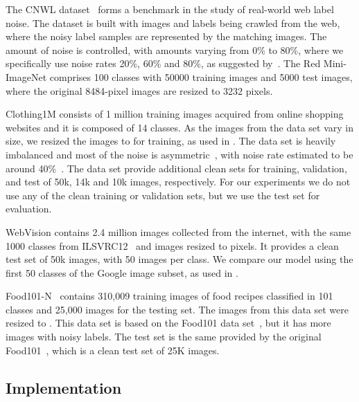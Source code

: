 \documentclass[review]{elsarticle}
\begin{document}
 
The CNWL dataset~\cite{jiang2020beyond} forms a benchmark in the study of real-world web label noise. The dataset is built with images and labels being crawled from the web, where the noisy label samples are represented by the matching images. 
The amount of noise is controlled, with amounts varying from 0\% to 80\%, where we specifically use noise rates 20\%, 60\% and 80\%, as suggested by~\cite{FaMUS}. 
The Red Mini-ImageNet comprises 100 classes with 50000 training images and 5000 test images, where the original 8484-pixel images are resized to 3232 pixels.

Clothing1M consists of 1 million training images acquired from online shopping websites and it is composed of 14 classes.
As the images from the data set vary in size, we resized the images to  for training, as used in \cite{li2020dividemix, han2019deep}.
The data set is heavily imbalanced and most of the noise is asymmetric~\cite{yi2019probabilistic}, with noise rate estimated to be around 40\%~\cite{xiao2015learning}. The data set provide additional clean sets for 
training, validation, and test of 50k, 14k and 10k images, respectively. For our experiments we do not use any of the clean training or validation sets, but we use the test set for evaluation.

WebVision contains 2.4 million images collected from the internet, with the same 1000 classes from ILSVRC12~\cite{deng2009imagenet} and images resized  to  pixels. It provides a clean test set of 50k images, with 50 images per class. We compare our model using the first 50 classes of the Google image subset, as used in \cite{li2020dividemix, chen2019understanding}.


Food101-N~\cite{lee2018cleannet} contains 310,009 training images of food recipes classified in 101 classes and 25,000 images for the testing set. The images from this data set were resized to . 
This data set is based on the Food101 data set~\cite{bossard2014food}, but it has more images with noisy labels. 
The test set is the same provided by the original Food101~\cite{bossard2014food}, which is a clean test set of 25K images.



\subsection{Implementation}
\end{document}
